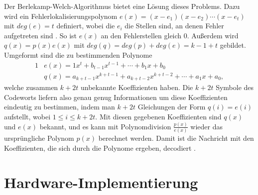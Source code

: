 Der Berlekamp-Welch-Algorithmus bietet eine Lösung dieses Problems. 
Dazu wird ein Fehlerlokalisierungspolynom $e(x)=(x-e_1)(x-e_2)\cdots(x-e_t)$ mit $deg(e)=t$ definiert, wobei die $e_i$ die Stellen sind, an denen Fehler aufgetreten sind \cite{weitzKonkreteMathematikNicht2021}.
So ist $e(x)$ an den Fehlerstellen gleich 0.
Außerdem wird $q(x)=p(x)e(x)$ mit $deg(q)=deg(p)+deg(e)=k-1+t$ gebildet.
Umgeformt sind die zu bestimmenden Polynome
\begin{alignat}{1}
	&e(x)=1x^t+b_{t-1}x^{t-1}+\cdots+b_1x+b_0\nonumber\\
	&q(x)=a_{k+t-1}x^{k+t-1}+a_{k+t-2}x^{k+t-2}+\cdots+a_1x+a_0,\nonumber
\end{alignat}
welche zusammen $k+2t$ unbekannte Koeffizienten haben.
Die $k+2t$ Symbole des Codeworts liefern also genau genug Informationen um diese Koeffizienten eindeutig zu bestimmen, indem man $k+2t$ Gleichungen der Form $q(i)=e(i)$ aufstellt, wobei $1\leq i\leq k+2t$.
Mit diesen gegebenen Koeffizienten sind $q(x)$ und $e(x)$ bekannt, und es kann mit  Polynomdivision $\frac{p(x)}{e(x)}$ wieder das ursprüngliche Polynom $p(x)$ berechnet werden. Damit ist die Nachricht mit den Koeffizienten, die sich durch die Polynome ergeben, decodiert \cite{fengBerlekampWelchAlgorithmGuide}.

\section{Hardware-Implementierung}\label{sec:hardware}


